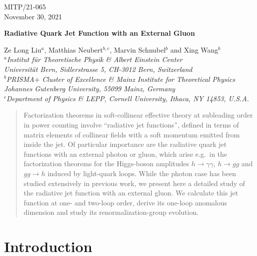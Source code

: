 \documentclass[12pt]{article}
\numberwithin{equation}{section}
\begin{document}
\begin{titlepage}
\begin{flushright}
MITP/21-065\\ 
November 30, 2021
\end{flushright}
		
\vspace{0.5cm}
\begin{center}
\Large\bf\boldmath
Radiative Quark Jet Function with an External Gluon
\end{center}
		
\vspace{0.5cm}
\begin{center}
Ze Long Liu$^a$, Matthias Neubert$^{b,c}$, Marvin Schnubel$^{b}$ and Xing Wang$^{b}$\\[7mm]
{\sl ${}^a$Institut f\"ur Theoretische Physik \& Albert Einstein Center\\ 
Universit\"at Bern, Sidlerstrasse 5, CH-3012 Bern, Switzerland\\[2mm]
${}^b$PRISMA$+$ Cluster of Excellence \& Mainz Institute for Theoretical Physics\\
Johannes Gutenberg University, 55099 Mainz, Germany\\[2mm]
${}^c$Department of Physics \& LEPP, Cornell University, Ithaca, NY 14853, U.S.A.}
\end{center}
		
\vspace{0.8cm}
\begin{abstract}
Factorization theorems in soft-collinear effective theory at subleading order in power counting involve ``radiative jet functions'', defined in terms of matrix elements of collinear fields with a soft momentum emitted from inside the jet. Of particular importance are the radiative quark jet functions with an external photon or gluon, which arise e.g.\ in the factorization theorems for the Higgs-boson amplitudes $h\to\gamma\gamma$, $h\to gg$ and $gg\to h$ induced by light-quark loops. While the photon case has been studied extensively in previous work, we present here a detailed study of the radiative jet function with an external gluon. We calculate this jet function at one- and two-loop order, derive its one-loop anomalous dimension and study its renormalization-group evolution.
\end{abstract}
\end{titlepage}
	

\section{Introduction}
\end{document}
